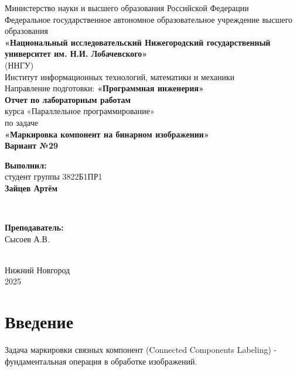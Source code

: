 \documentclass[a4paper,14pt]{article}
\begin{document}
\begin{titlepage}
    \centering
    \large
    Министерство науки и высшего образования Российской Федерации\\[0.5cm]
    Федеральное государственное автономное образовательное учреждение высшего образования\\[0.5cm]
    \textbf{«Национальный исследовательский Нижегородский государственный университет им. Н.И. Лобачевского»}\\
    (ННГУ)\\[1cm]
    Институт информационных технологий, математики и механики\\[0.5cm]
    Направление подготовки: \textbf{«Программная инженерия»}\\[1.5cm]

    \vfill
    {\LARGE \textbf{Отчет по лабораторным работам }}\\[0.5cm]
    {\Large курса «Параллельное программирование» }\\[0.5cm]
    {\Large по задаче}\\[0.5cm]
    {\LARGE \textbf{«Маркировка компонент на бинарном изображении»}}\\[0.5cm]
    {\Large \textbf{Вариант №29}}\\[2.5cm]

    \hfill\parbox{0.5\textwidth}{
        \textbf{Выполнил:} \\
        студент группы 3822Б1ПР1 \\
        \textbf{Зайцев Артём}
    }\\[0.5cm]

    \hfill\parbox{0.5\textwidth}{
        \textbf{Преподаватель:} \\
        Сысоев А.В.

    }\\[2cm]
    
    \vfill
    { Нижний Новгород } \\
    { 2025 }
\end{titlepage}

\section{Введение}

Задача маркировки связных компонент (Connected Components Labeling) - фундаментальная операция в обработке изображений.
\end{document}
